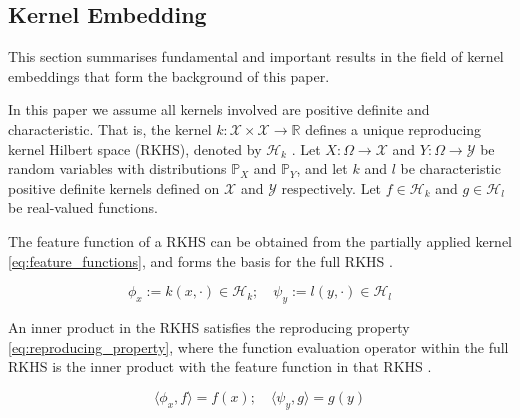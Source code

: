 \documentclass[twoside]{article} \usepackage{aistats2017}
\theoremstyle{definition}
\theoremstyle{theorem}
\newcommand{\rv}[1]{{#1}}
\newcommand{\extra}[1]{{\color{ForestGreen} #1}}
\newcommand{\inner}[2]{{\langle #1, #2 \rangle}}
\newcommand{\Hk}{\mathcal{H}_{k}}
\newcommand{\Hl}{\mathcal{H}_{l}}
\begin{document}
	\subsection{Kernel Embedding}
	\label{sec:background:kernel_embedding}
	
		This section summarises fundamental and important results in the field of kernel embeddings that form the background of this paper.

		In this paper we assume all kernels involved are positive definite and characteristic. That is, the kernel $k : \mathcal{X} \times \mathcal{X} \to \mathbb{R}$ defines a unique reproducing kernel Hilbert space (RKHS), denoted by $\mathcal{H}_{k}$ \citep{fukumizu2004dimensionality}. Let $\rv{X} : \Omega \to \mathcal{X}$ and $\rv{Y} : \Omega \to \mathcal{Y}$ be random variables with distributions $\mathbb{P}_{\rv{X}}$ and $\mathbb{P}_{\rv{Y}}$, and let $k$ and $l$ be characteristic positive definite kernels defined on $\mathcal{X}$ and $\mathcal{Y}$ respectively. Let $f \in \Hk$ and $g \in \Hl$ be real-valued functions.
		
		The feature function of a RKHS can be obtained from the partially applied kernel \eqref{eq:feature_functions}, and forms the basis for the full RKHS \citep{muandet2016kernel}.
			
		\begin{equation}
			\phi_{x} := k(x, \cdot) \in \Hk ;\quad \psi_{y} := l(y, \cdot) \in \Hl
		\label{eq:feature_functions}
		\end{equation}

		An inner product in the RKHS satisfies the reproducing property \eqref{eq:reproducing_property}, where the function evaluation operator within the full RKHS is the inner product with the feature function in that RKHS \citep{muandet2016kernel}.

		\begin{equation}
			\inner{\phi_{x}}{f} = f(x) ;\quad \inner{\psi_{y}}{g} = g(y)
		\label{eq:reproducing_property}
		\end{equation}
		
%
		
\end{document}
